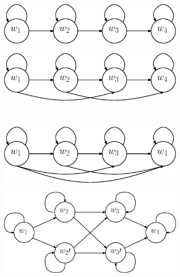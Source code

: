 \documentclass[a4paper, oneside]{csthesis}
\begin{document}
\begin{figure}
        \centering
        \begin{subfigure}[b]{0.45\textwidth}
                \centering
                \includegraphics[width=\textwidth]{figures/hmm-ltr1.eps}
                \caption{}
                \label{fig:hmm1}
        \end{subfigure}%
        \quad
        \begin{subfigure}[b]{0.45\textwidth}
                \centering
                \includegraphics[width=\textwidth]{figures/hmm-ltr2.eps}
                \caption{}
                \label{fig:hmm1}
        \end{subfigure}%

        ~ %
        \begin{subfigure}[b]{0.45\textwidth}
                \centering
                \includegraphics[width=\textwidth]{figures/hmm-ltr3.eps}
                \caption{}
                \label{fig:hmm1}
        \end{subfigure}%
        \quad
        \begin{subfigure}[b]{0.45\textwidth}
                \centering
                \includegraphics[width=\textwidth]{figures/hmm-ltr5.eps}
                \caption{}
                \label{fig:hmm1}
        \end{subfigure}%


\end{figure}
\end{document}
